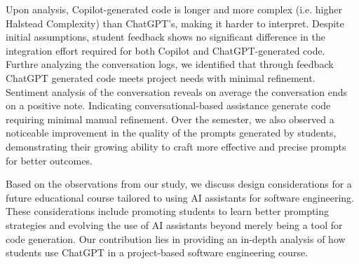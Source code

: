 Upon analysis, Copilot-generated code is longer and more complex (i.e. higher Halstead Complexity) than ChatGPT's, making it harder to interpret. Despite initial assumptions, student feedback shows no significant difference in the integration effort required for both Copilot and ChatGPT-generated code. Furthre analyzing the conversation logs, we identified that through feedback ChatGPT generated code meets project needs with minimal refinement. Sentiment analysis of the conversation reveals on average the conversation ends on a positive note. Indicating conversational-based assistance generate code requiring minimal manual refinement. Over the semester, we also observed a noticeable improvement in the quality of the prompts generated by students, demonstrating their growing ability to craft more effective and precise prompts for better outcomes.

Based on the observations from our study, we discuss design considerations for a future educational course tailored to using AI assistants for software engineering. These considerations include promoting students to learn better prompting strategies and evolving the use of AI assistants beyond merely being a tool for code generation. Our contribution lies in providing an in-depth analysis of how students use ChatGPT in a project-based software engineering course.  